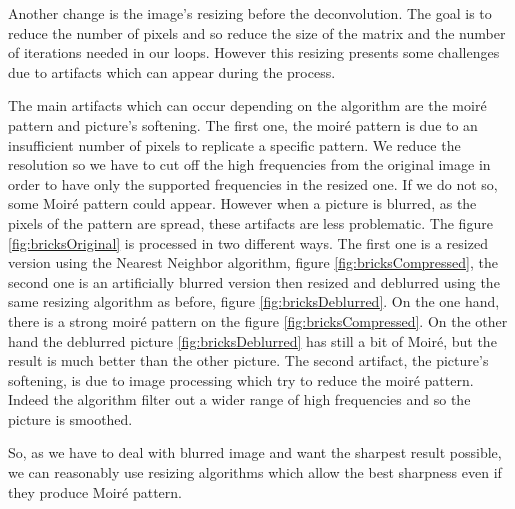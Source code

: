 Another change is the image's resizing before the deconvolution. The goal is to reduce the number of pixels and so reduce the size of the matrix and the number of iterations needed in our loops.  However this resizing presents some challenges due to artifacts which can appear during the process.


The main artifacts which can occur depending on the algorithm are the moiré pattern and picture's softening.  
The first one, the moiré pattern is due to an insufficient number of pixels to replicate a specific pattern. We reduce the resolution so we have to cut off the high frequencies from the original image in order to have only the supported frequencies in the resized one. If we do not so, some Moiré pattern could appear.  However when a picture is blurred, as the pixels of the pattern are spread, these artifacts are less problematic. The figure \ref{fig:bricksOriginal} is processed in two different ways. The first one is a resized version using the Nearest Neighbor algorithm, figure \ref{fig:bricksCompressed}, the second one is an artificially blurred version then resized and deblurred using the same resizing algorithm as before, figure \ref{fig:bricksDeblurred}. On the one hand, there is a strong moiré pattern on the figure \ref{fig:bricksCompressed}. On the other hand the deblurred picture \ref{fig:bricksDeblurred} has still a bit of Moiré, but the result is much better than the other picture. 
The second artifact, the picture's softening, is due to image processing which try to reduce the moiré pattern. Indeed the algorithm filter out a wider range of high frequencies and so the picture is smoothed.  

So, as we have to deal with blurred image and want the sharpest result possible, we can reasonably use resizing algorithms which allow the best sharpness even if they produce Moiré pattern. 



